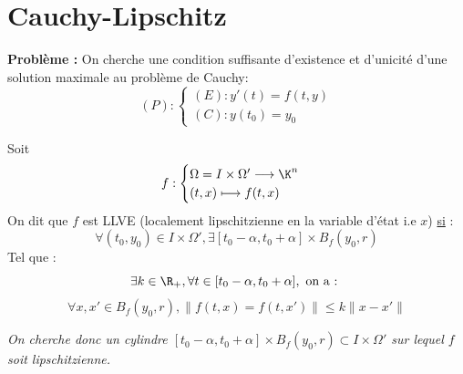 \minitoc  %


\section{Cauchy-Lipschitz}

\textbf{Problème : } On cherche une condition suffisante d'existence et d'unicité d'une solution maximale au problème 
de Cauchy: 
    \[ (P) : 
        \begin{cases}
            (E) : y'(t) = f(t,y) \\ 
            (C) : y(t_0) = y_0 
        \end{cases}
    \] 

\begin{definition}
    Soit 
        \[ f : 
            \begin{cases}
                \Omega = I \times \Omega' \longrightarrow \K^n \\ 
                (t,x) \longmapsto f(t,x)
            \end{cases} \] 
    On dit que $f$ est LLVE (localement lipschitzienne en la variable d'état i.e $x$) \underline{si} :
        \[ \forall (t_0, y_0) \in I \times \Omega', \exists [t_0 - \alpha, t_0 + \alpha] \times B_f(y_0,r) \] 
    Tel que : 
        \[ \exists k \in \R_+, \forall t \in [t_0 - \alpha, t_0 + \alpha], \text{ on a : } \] 
        \[ \boxed{ \forall x,x' \in B_f(y_0,r), \| f(t,x) = f(t,x') \| \leqslant k \| x - x'\| } \] 
    
    \emph{On cherche donc un cylindre $[t_0 - \alpha, t_0 + \alpha] \times B_f(y_0,r) \subset I \times \Omega'$ sur lequel 
    $f$ soit lipschitzienne.}
\end{definition}

